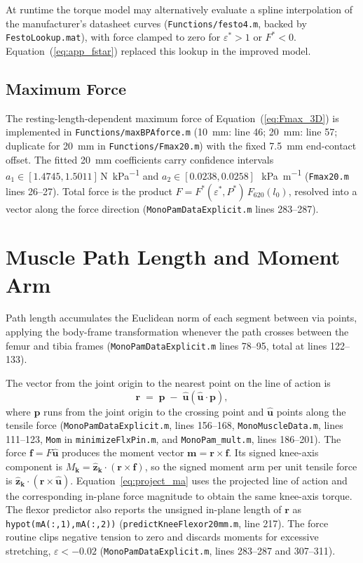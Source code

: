 At runtime the torque model may alternatively evaluate a spline interpolation of the manufacturer's datasheet curves (\nolinkurl{Functions/festo4.m}, backed by \texttt{FestoLookup.mat}), with force clamped to zero for $\varepsilon^{*}>1$ or $F^{*}<0$. Equation~(\ref{eq:app_fstar}) replaced this lookup in the improved model.

\subsection{Maximum Force}
The resting-length-dependent maximum force of Equation~(\ref{eq:Fmax_3D}) is implemented in \nolinkurl{Functions/maxBPAforce.m} (\qty{10}{\mm}: line 46; \qty{20}{\mm}: line 57; duplicate for \qty{20}{\mm} in \nolinkurl{Functions/Fmax20.m}) with the fixed \qty{7.5}{\mm} end-contact offset. The fitted \qty{20}{\mm} coefficients carry confidence intervals $a_1 \in [1.4745, 1.5011]$\,\si{\N\per\kPa} and $a_2 \in [0.0238, 0.0258]$\,\si{\per\kPa\per\metre} (\texttt{Fmax20.m} lines 26--27). Total force is the product $F = F^{*}(\varepsilon^{*},P^{*})\,F_{620}(l_{0})$, resolved into a vector along the force direction (\texttt{MonoPamDataExplicit.m} lines 283--287).

\section{Muscle Path Length and Moment Arm}

Path length accumulates the Euclidean norm of each segment between via points, applying the body-frame transformation whenever the path crosses between the femur and tibia frames (\texttt{MonoPamDataExplicit.m} lines 78--95, total at lines 122--133).

The vector from the joint origin to the nearest point on the line of action is
\begin{equation}
    \mathbf{r} \;=\; \mathbf{p} \;-\; \hat{\mathbf{u}}\left(\hat{\mathbf{u}}\cdot\mathbf{p}\right),
    \label{eq:app_perpfoot}
\end{equation}
where $\mathbf{p}$ runs from the joint origin to the crossing point and $\hat{\mathbf{u}}$ points along the tensile force (\texttt{MonoPamDataExplicit.m}, lines 156--168, \texttt{MonoMuscleData.m}, lines 111--123, \texttt{Mom} in \texttt{minimizeFlxPin.m}, and \nolinkurl{MonoPam_mult.m}, lines 186--201).
The force $\mathbf{f}=F\hat{\mathbf{u}}$ produces the moment vector $\mathbf{m}=\mathbf{r}\times\mathbf{f}$. Its signed knee-axis component is $M_{\mathbf{k}}=\hat{\mathbf{z}}_{\mathbf{k}}\cdot(\mathbf{r}\times\mathbf{f})$, so the signed moment arm per unit tensile force is $\hat{\mathbf{z}}_{\mathbf{k}}\cdot(\mathbf{r}\times\hat{\mathbf{u}})$. Equation~\eqref{eq:project_ma} uses the projected line of action and the corresponding in-plane force magnitude to obtain the same knee-axis torque. The flexor predictor also reports the unsigned in-plane length of $\mathbf{r}$ as \texttt{hypot(mA(:,1),mA(:,2))} (\texttt{predictKneeFlexor20mm.m}, line 217). The force routine clips negative tension to zero and discards moments for excessive stretching, $\varepsilon<-0.02$ (\texttt{MonoPamDataExplicit.m}, lines 283--287 and 307--311).

